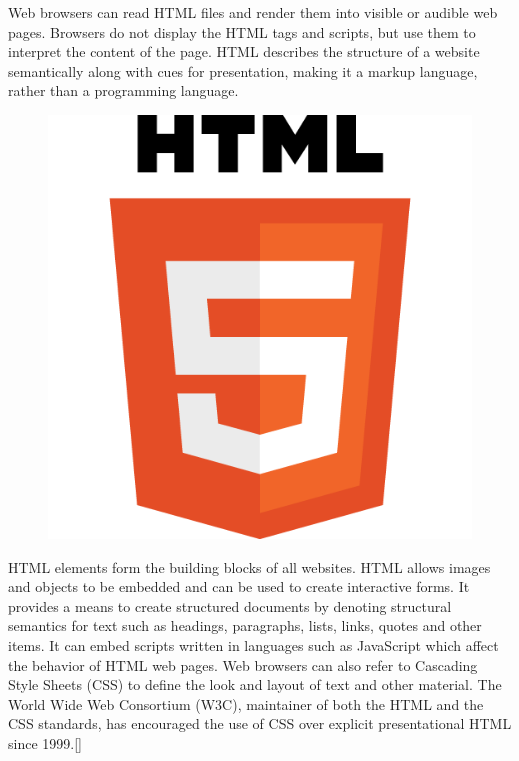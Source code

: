 Web browsers can read HTML files and render them into visible or audible web pages. Browsers do not display the HTML tags and scripts, but use them to interpret the content of the page. HTML describes the structure of a website semantically along with cues for presentation, making it a markup language, rather than a programming language.
\newline
\begin{figure}[h]
	\centering
	\includegraphics[width=0.4\linewidth]{images/HTML5_Logo_512}
	\label{fig:html-logo}
\end{figure}
HTML elements form the building blocks of all websites. HTML allows images and objects to be embedded and can be used to create interactive forms. It provides a means to create structured documents by denoting structural semantics for text such as headings, paragraphs, lists, links, quotes and other items. It can embed scripts written in languages such as JavaScript which affect the behavior of HTML web pages.
Web browsers can also refer to Cascading Style Sheets (CSS) to define the look and layout of text and other material. The World Wide Web Consortium (W3C), maintainer of both the HTML and the CSS standards, has encouraged the use of CSS over explicit presentational HTML since 1999.[\cite{7}]

